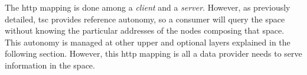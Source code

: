 



%
%























The \acs{http} mapping is done among a \textit{client} and a \textit{server}.
However, as previously detailed, \ac{tsc} provides reference autonomy, so a consumer will query the space without knowing the particular addresses of the nodes composing that space.
This autonomy is managed at other upper and optional layers explained in the following section.
However, this \acs{http} mapping is all a data provider needs to serve information in the space.


